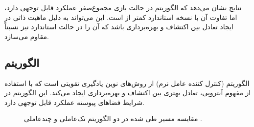 نتایج نشان می‌دهد که الگوریتم  در حالت بازی مجموع‌صفر عملکرد قابل توجهی دارد، اما تفاوت آن با نسخه استاندارد کمتر از  است. این می‌تواند به دلیل ماهیت ذاتی  در ایجاد تعادل بین اکتشاف و بهره‌برداری باشد که آن را در حالت استاندارد نیز نسبتاً مقاوم می‌سازد.

\subsection{الگوریتم }

الگوریتم  (کنترل کننده عامل نرم) از روش‌های نوین یادگیری تقویتی است که با استفاده از مفهوم آنتروپی، تعادل بهتری بین اکتشاف و بهره‌برداری ایجاد می‌کند. این الگوریتم در شرایط فضاهای پیوسته عملکرد قابل توجهی دارد.

\begin{figure}[H]
	\centering
	
	
	\caption{
		مقایسه مسیر طی شده در دو الگوریتم تک‌عاملی و چندعاملی .
	}
\end{figure}


